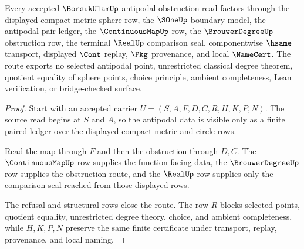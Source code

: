\begin{theorem}
\label{thm:borsuk-ulam-antipodal-route}
Every accepted $\BorsukUlamUp$ antipodal-obstruction read factors through the displayed compact metric sphere row, the $\SOneUp$ boundary model, the antipodal-pair ledger, the $\ContinuousMapUp$ row, the $\BrouwerDegreeUp$ obstruction row, the terminal $\RealUp$ comparison seal, componentwise $\hsame$ transport, displayed $\Cont$ replay, $\Pkg$ provenance, and local $\NameCert$. The route exports no selected antipodal point, unrestricted classical degree theorem, quotient equality of sphere points, choice principle, ambient completeness, Lean verification, or bridge-checked surface.
\end{theorem}
\begin{proof}
Start with an accepted carrier $U=(S,A,F,D,C,R,H,K,P,N)$. The source read begins at $S$ and $A$, so the antipodal data is visible only as a finite paired ledger over the displayed compact metric and circle rows.

Read the map through $F$ and then the obstruction through $D,C$. The $\ContinuousMapUp$ row supplies the function-facing data, the $\BrouwerDegreeUp$ row supplies the obstruction route, and the $\RealUp$ row supplies only the comparison seal reached from those displayed rows.

The refusal and structural rows close the route. The row $R$ blocks selected points, quotient equality, unrestricted degree theory, choice, and ambient completeness, while $H,K,P,N$ preserve the same finite certificate under transport, replay, provenance, and local naming.
\end{proof}




